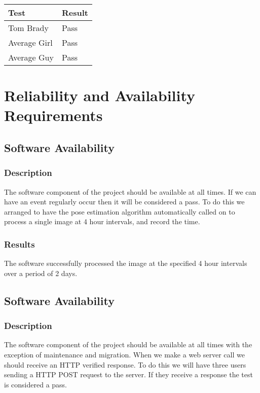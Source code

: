 \documentclass{scrreprt}
\begin{document}
\begin{table}[H]
        \centering
        \begin{tabular}{||p{2.5cm}|p{2.5cm}||}
                \hline
                \textbf Test & \textbf Result\\
                \hline\hline
                Tom Brady & Pass  \\
                \hline\hline
                Average Girl & Pass  \\
                \hline\hline
                Average Guy & Pass  \\
                \hline
        \end{tabular}
\end{table}

\section{Reliability and Availability Requirements}
\subsection{Software Availability}
\subsubsection{Description}

The software component of the project should be available at all times. If we
can have an event regularly occur then it will be considered a pass. To do this
we arranged to have the pose estimation algorithm automatically called on to
process a single image at 4 hour intervals, and record the time.

\subsubsection{Results}

The software successfully processed the image at the specified 4 hour intervals
over a period of 2 days.

\subsection{Software Availability}
\subsubsection{Description}

The software component of the project should be available at all times with the
exception of maintenance and migration. When we make a web server call we should
receive an HTTP verified response. To do this we will have three users sending
a HTTP POST request to the server. If they receive a response the test is
considered a pass.
\end{document}
